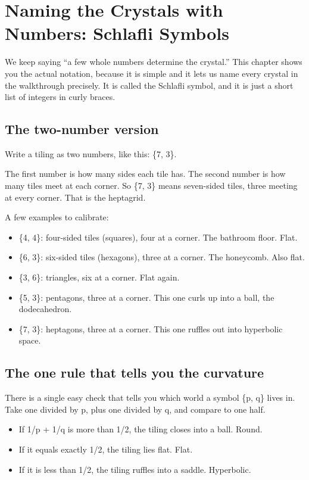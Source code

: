 \section{Naming the Crystals with Numbers: Schlafli Symbols}

We keep saying ``a few whole numbers determine the crystal.'' This chapter shows you the actual notation, because it is simple and it lets us name every crystal in the walkthrough precisely. It is called the Schlafli symbol, and it is just a short list of integers in curly braces.

\subsection{The two-number version}

Write a tiling as two numbers, like this: \{7, 3\}.

The first number is how many sides each tile has. The second number is how many tiles meet at each corner. So \{7, 3\} means seven-sided tiles, three meeting at every corner. That is the heptagrid.

A few examples to calibrate:

\begin{itemize}
\item \{4, 4\}: four-sided tiles (squares), four at a corner. The bathroom floor. Flat.
\item \{6, 3\}: six-sided tiles (hexagons), three at a corner. The honeycomb. Also flat.
\item \{3, 6\}: triangles, six at a corner. Flat again.
\item \{5, 3\}: pentagons, three at a corner. This one curls up into a ball, the dodecahedron.
\item \{7, 3\}: heptagons, three at a corner. This one ruffles out into hyperbolic space.
\end{itemize}

\subsection{The one rule that tells you the curvature}

There is a single easy check that tells you which world a symbol \{p, q\} lives in. Take one divided by p, plus one divided by q, and compare to one half.

\begin{itemize}
\item If 1/p + 1/q is more than 1/2, the tiling closes into a ball. Round.
\item If it equals exactly 1/2, the tiling lies flat. Flat.
\item If it is less than 1/2, the tiling ruffles into a saddle. Hyperbolic.
\end{itemize}

